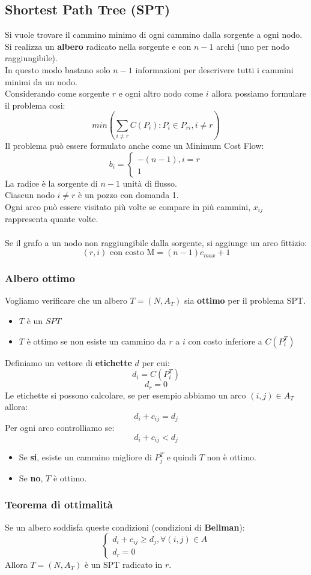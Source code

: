 \documentclass[12pt,a4paper]{article}
\begin{document}
\subsection{Shortest Path Tree (SPT)}
Si vuole trovare il cammino minimo di ogni cammino dalla sorgente a ogni nodo.\\
Si realizza un \textbf{albero} radicato nella sorgente e con $n-1$ archi (uno per nodo raggiungibile).\\
In questo modo bastano solo $n-1$ informazioni per descrivere tutti i cammini minimi da un nodo.\\
Considerando come sorgente $r$ e ogni altro nodo come $i$ allora possiamo formulare il problema cosi:
\[
min(\sum_{i\ne r}^{} C(P_i): P_i \in P_{ri}, i \ne r)
\]
Il problema può essere formulato anche come un Minimum Cost Flow:
\[
b_i = \begin{cases}
    -(n-1), i = r\\
    1
\end{cases}
\]
La radice è la sorgente di $n-1$ unità di flusso.\\
Ciascun nodo $i \ne r$ è un pozzo con domanda 1.\\
Ogni arco può essere visitato più volte se compare in più cammini, $x_{ij}$ rappresenta quante volte.\\\\
Se il grafo a un nodo non raggiungibile dalla sorgente, si aggiunge un arco fittizio:
\[
(r,i) \text{ con costo M} = (n-1)c_{max} + 1
\]
\subsubsection{Albero ottimo}
Vogliamo verificare che un albero $T = (N,A_T)$ sia \textbf{ottimo} per il problema SPT.
\begin{itemize}
    \item $T$ è un $SPT$
    \item $T$ è ottimo se non esiste un cammino da $r$ a $i$ con costo inferiore a $C(P_i^T)$
\end{itemize}
Definiamo un vettore di \textbf{etichette} $d$ per cui:
\[
d_i = C(P_i^T)
\]
\[
d_r = 0
\]
Le etichette si possono calcolare, se per esempio abbiamo un arco $(i,j) \in A_T$ allora:
\[
d_i + c_{ij} = d_j
\]
Per ogni arco controlliamo se:
\[
d_i + c_{ij} < d_j
\]
\begin{itemize}
    \item Se \textbf{si}, esiste un cammino migliore di $P_j^T$ e quindi $T$ non è ottimo.
    \item Se \textbf{no}, $T$ è ottimo.
\end{itemize}
\subsubsection{Teorema di ottimalità}
Se un albero soddisfa queste condizioni (condizioni di \textbf{Bellman}):
\[
\begin{cases}
    d_i + c_{ij} \geq d_j, \forall (i,j) \in A\\
    d_r = 0
\end{cases}
\]
Allora $T = (N,A_T)$ è un SPT radicato in $r$.
\end{document}
